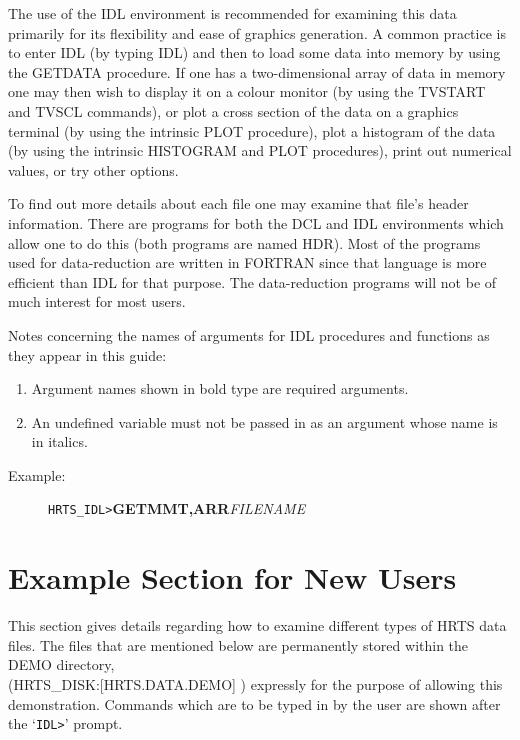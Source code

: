 The use of the IDL environment is recommended for examining this data primarily
for its flexibility and ease of graphics generation. A common practice is to
enter IDL (by typing IDL) and then to load some data into memory by using the
GETDATA  procedure. If one has a two-dimensional array of data in memory one
may then wish to display it on a colour monitor (by using the TVSTART and TVSCL
commands), or plot a cross section of the data on a graphics terminal (by using
the intrinsic PLOT procedure), plot a histogram of the data (by using the
intrinsic HISTOGRAM and PLOT procedures), print out numerical values, or try
other options.

To find out more details about each file one may examine that file's header
information. There are programs for both the DCL and IDL environments which
allow one to do this (both programs are named  HDR). Most of the programs used
for data-reduction are written in FORTRAN since that language is more efficient
than IDL for that purpose. The data-reduction programs will not be of much
interest for most users.

Notes concerning the names of arguments for IDL procedures and functions as
they appear in this guide:
\begin{enumerate}
\item Argument names shown in bold type are required arguments.
\item An undefined variable must not be passed in as an argument whose name is
in italics.
\end{enumerate}
\begin{description}
\item [Example: ] {\tt HRTS\_IDL>}{\bf GETMMT,ARR}{\it FILENAME}
\end{description}

\newpage

\section{Example Section for New Users}


This section gives details regarding how to examine different types of HRTS
data files.  The files that are mentioned below are permanently stored within
the DEMO directory, \\(HRTS\_DISK:[HRTS.DATA.DEMO] ) expressly for the purpose
of allowing this demonstration.  Commands which are to be typed in by the user
are shown after the `\verb+IDL>+' prompt.

